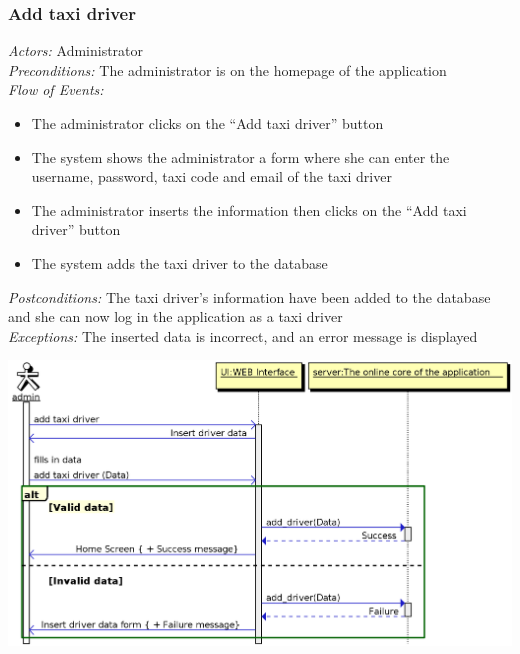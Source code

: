 \documentclass{article}
\begin{document}
\subsubsection{Add taxi driver}
\textit{Actors:} Administrator
\\\textit{Preconditions:} The administrator is on the homepage of the application
\\\textit{Flow of Events:}
\begin{itemize}
	\item  The administrator clicks on the ``Add taxi driver'' button
	\item  The system shows the administrator a form where she can enter the username, password, taxi code and email of the taxi driver 
	\item  The administrator inserts the information then clicks on the ``Add taxi driver'' button
	\item  The system adds the taxi driver to the database
\end{itemize}
\textit{Postconditions:} The taxi driver's information have been added to the database and she can now log in the application as a taxi driver
\\\textit{Exceptions:} The inserted data is incorrect, and an error message is displayed 
\begin{center}	
	\includegraphics[width=\textwidth,keepaspectratio]{Sequence-Diagrams/add-taxi-driver}
\end{center}
\end{document}
